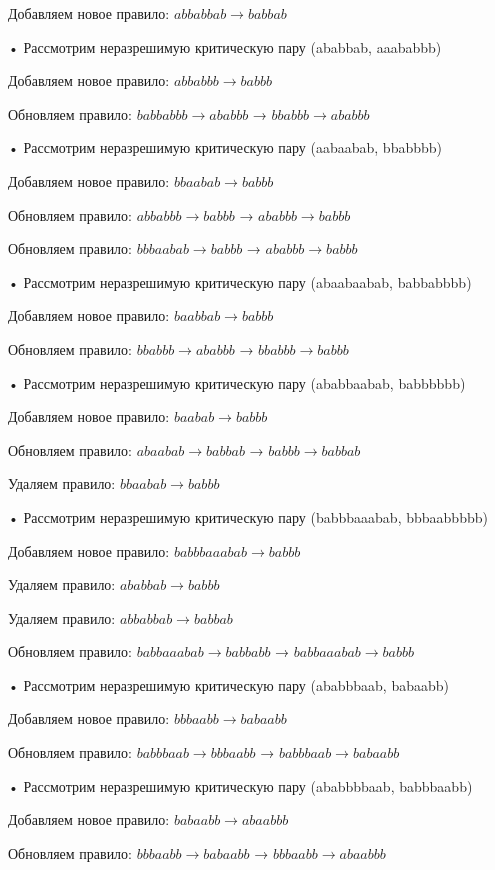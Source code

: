 \documentclass[a4paper, 14pt]{extarticle}
\begin{document}
        Добавляем новое правило: $abbabbab \to babbab$

   • Рассмотрим неразрешимую критическую пару (ababbab, aaababbb)

        Добавляем новое правило: $abbabbb \to babbb$

    Обновляем правило: $babbabbb \to ababbb$ → $bbabbb \to ababbb$

   • Рассмотрим неразрешимую критическую пару (aabaabab, bbabbbb)

        Добавляем новое правило: $bbaabab \to babbb$

    Обновляем правило: $abbabbb \to babbb$ → $ababbb \to babbb$

    Обновляем правило: $bbbaabab \to babbb$ → $ababbb \to babbb$

   • Рассмотрим неразрешимую критическую пару (abaabaabab, babbabbbb)

        Добавляем новое правило: $baabbab \to babbb$

    Обновляем правило: $bbabbb \to ababbb$ → $bbabbb \to babbb$

   • Рассмотрим неразрешимую критическую пару (ababbaabab, babbbbbb)

        Добавляем новое правило: $baabab \to babbb$

    Обновляем правило: $abaabab \to babbab$ → $babbb \to babbab$

    Удаляем правило: $bbaabab \to babbb$

   • Рассмотрим неразрешимую критическую пару (babbbaaabab, bbbaabbbbb)

        Добавляем новое правило: $babbbaaabab \to babbb$

    Удаляем правило: $ababbab \to babbb$

    Удаляем правило: $abbabbab \to babbab$

    Обновляем правило: $babbaaabab \to babbabb$ → $babbaaabab \to babbb$

   • Рассмотрим неразрешимую критическую пару (ababbbaab, babaabb)

        Добавляем новое правило: $bbbaabb \to babaabb$

    Обновляем правило: $babbbaab \to bbbaabb$ → $babbbaab \to babaabb$

   • Рассмотрим неразрешимую критическую пару (ababbbbaab, babbbaabb)

        Добавляем новое правило: $babaabb \to abaabbb$

    Обновляем правило: $bbbaabb \to babaabb$ → $bbbaabb \to abaabbb$
\end{document}

